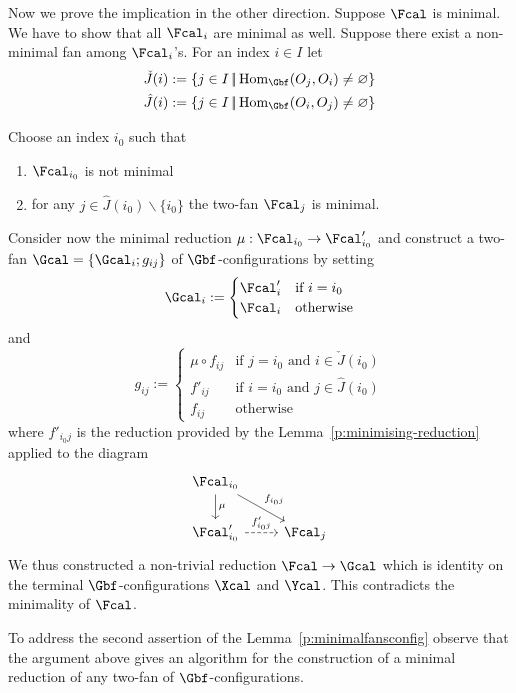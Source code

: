 \begin{Proof}
  Now we prove the implication in the other direction. Suppose $\Fcal$ is
  minimal. We have to show that all $\Fcal_{i}$ are minimal as well.
  Suppose there exist a non-minimal fan among $\Fcal_{i}$'s.  For an
  index $i \in I$ let
  \begin{align*}
    \check J(i)
    &:=
    \set{j\in I \st\Hom_{\Gbf}(O_{j},O_{i})\neq\emptyset}
    \\
    \hat J(i)
    &:=
    \set{j\in I \st\Hom_{\Gbf}(O_{i},O_{j})\neq\emptyset}
  \end{align*}
  
 	  
  Choose an index $i_{0}$ such that 
  \begin{enumerate}
  	\item  $\Fcal_{i_{0}}$ is not minimal
  	\item for any $j\in \hat J(i_{0}) \backslash \{ i_0 \}$ the two-fan $\Fcal_{j}$ is
  minimal. 
  \end{enumerate}
  Consider now the minimal reduction
  $\mu:\Fcal_{i_{0}}\to\Fcal'_{i_{0}}$ and construct a two-fan
  $\Gcal=\set{\Gcal_{i};g_{ij}}$ of $\Gbf$-configurations by setting
  \[
  \Gcal_{i}
  :=
  \begin{cases}
    \Fcal'_{i}
    &
    \text{if $i=i_{0}$}
    \\
    \Fcal_{i}
    &
    \text{otherwise}
  \end{cases}
  \]
  and 
  \[
  g_{ij}
  :=
  \begin{cases}
    \mu\circ f_{ij}
    &
    \text{if $j=i_{0}$ and $i\in\check J(i_{0})$}
    \\
    f'_{ij}
    &
    \text{if $i=i_{0}$ and $j\in\hat J(i_{0})$}
    \\
    f_{ij}
    &
    \text{otherwise}
  \end{cases}
  \]
  where $f'_{i_{0}j}$ is the reduction provided by the
  Lemma~\ref{p:minimising-reduction} applied to the diagram
  \[
  \begin{tikzcd}[ampersand replacement=\&]
    \Fcal_{i_{0}}
    \arrow{d}{\mu}
    \arrow{dr}{f_{i_{0}j}}
    \\
    \Fcal'_{i_{0}}
    \arrow[dashrightarrow]{r}{f'_{i_{0}j}}
    \&
    \Fcal_{j}
  \end{tikzcd}
  \]
  We thus constructed a non-trivial reduction $\Fcal\to\Gcal$ which is
  identity on the terminal  $\Gbf$-configurations $\Xcal$ and
  $\Ycal$. This contradicts the minimality of $\Fcal$.
  
  To address the second assertion of the
  Lemma~\ref{p:minimalfansconfig} observe that the argument above
  gives an algorithm for the construction of a minimal reduction of any
  two-fan of $\Gbf$-configurations.
\end{Proof}


